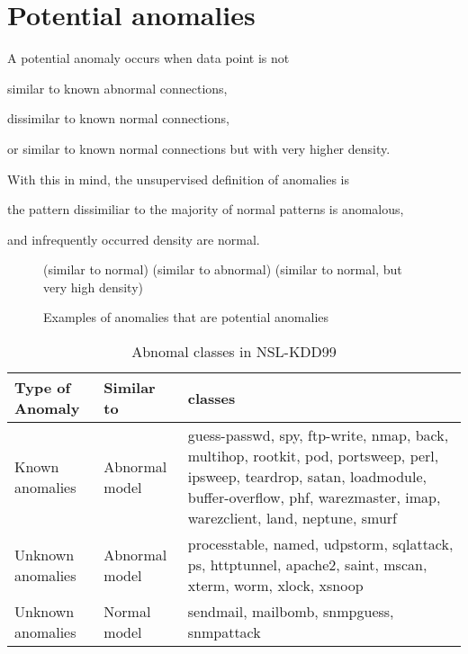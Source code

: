 \section{Potential anomalies}
A potential anomaly occurs when data point is not \begin{inparaenum}
\item similar to known abnormal connections,
\item dissimilar to known normal connections,
\item or similar to known normal connections but with very higher density.
\end{inparaenum}

With this in mind, the unsupervised definition of anomalies is \begin{inparaenum}
\item the pattern dissimiliar to the majority of normal patterns is anomalous, 
\item and infrequently occurred density are normal.
\end{inparaenum}

\begin{figure}[htb2]
\begin{center}
(similar to normal)
(similar to abnormal)
(similar to normal, but very high density)
\end{center}
\caption{Examples of anomalies that are potential anomalies}
\label{fig:refSingleRobot1}
\end{figure}

\begin{table}[h]
\begin{center}
\begin{tabular}{| l | l | p{5cm} |}
\hline
Type of Anomaly & Similar to & classes \\
\hline
Known anomalies & Abnormal model & guess-passwd, spy, ftp-write, nmap, back, multihop, rootkit, pod, portsweep, perl, ipsweep, teardrop, satan, loadmodule, buffer-overflow, phf, warezmaster, imap, warezclient, land, neptune, smurf \\ %
\hline
Unknown anomalies & Abnormal model & processtable, named, udpstorm, sqlattack, ps, httptunnel, apache2, saint, mscan, xterm, worm, xlock, xsnoop \\ %
\hline
Unknown anomalies & Normal model & sendmail, mailbomb, snmpguess, snmpattack \\ %
\hline
\end{tabular}
\end{center}
\caption{Abnomal classes in NSL-KDD99}
\label{fig:refSingleRobot1}
\end{table}

